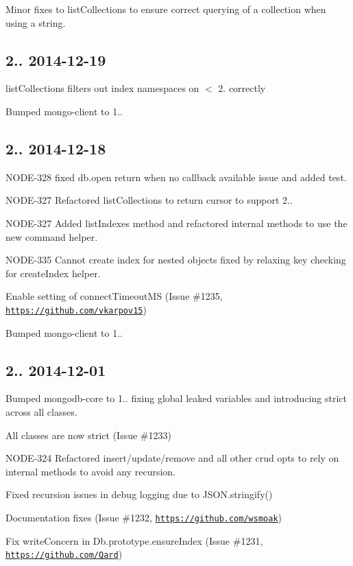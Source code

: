 \begin{DoxyItemize}
\item Minor fixes to list\+Collections to ensure correct querying of a collection when using a string.
\end{DoxyItemize}

\subsection*{2.. 2014-\/12-\/19 }


\begin{DoxyItemize}
\item list\+Collections filters out index namespaces on $<$ 2. correctly
\item Bumped mongo-\/client to 1..
\end{DoxyItemize}

\subsection*{2.. 2014-\/12-\/18 }


\begin{DoxyItemize}
\item N\+O\+D\+E-\/328 fixed db.\+open return when no callback available issue and added test.
\item N\+O\+D\+E-\/327 Refactored list\+Collections to return cursor to support 2..
\item N\+O\+D\+E-\/327 Added list\+Indexes method and refactored internal methods to use the new command helper.
\item N\+O\+D\+E-\/335 Cannot create index for nested objects fixed by relaxing key checking for create\+Index helper.
\item Enable setting of connect\+Timeout\+MS (Issue \#1235, \href{https://github.com/vkarpov15}{\tt https\+://github.\+com/vkarpov15})
\item Bumped mongo-\/client to 1..
\end{DoxyItemize}

\subsection*{2.. 2014-\/12-\/01 }


\begin{DoxyItemize}
\item Bumped mongodb-\/core to 1.. fixing global leaked variables and introducing strict across all classes.
\item All classes are now strict (Issue \#1233)
\item N\+O\+D\+E-\/324 Refactored insert/update/remove and all other crud opts to rely on internal methods to avoid any recursion.
\item Fixed recursion issues in debug logging due to J\+S\+O\+N.\+stringify()
\item Documentation fixes (Issue \#1232, \href{https://github.com/wsmoak}{\tt https\+://github.\+com/wsmoak})
\item Fix write\+Concern in Db.\+prototype.\+ensure\+Index (Issue \#1231, \href{https://github.com/Qard}{\tt https\+://github.\+com/\+Qard})
\end{DoxyItemize}

